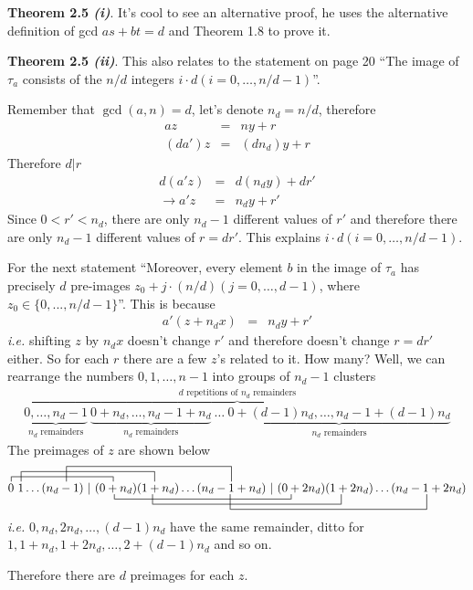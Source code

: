 \documentclass[aps,preprint,preprintnumbers,nofootinbib,showpacs,prd]{revtex4-1}
\newcommand{\ie}{{\it i.e.} }
\newcommand{\nbea}{\begin{eqnarray*}}
\newcommand{\neea}{\end{eqnarray*}}
\begin{document}
{\bf Theorem 2.5 {\it(i)}}. It's cool to see an alternative proof, he uses the alternative definition of gcd $as + bt = d$ and Theorem 1.8 to prove it. 

{\bf Theorem 2.5 {\it(ii)}}. This also relates to the statement on page 20 ``The image of $\tau_a$ consists of the $n/d$ integers $i\cdot d (i = 0, \dots, n/d - 1)$''.

Remember that $\gcd(a,n) = d$, let's denote $n_d = n/d$, therefore
%
\nbea
az & = & ny + r \\
(da')z & = & (dn_d)y + r
\neea
%
Therefore $d|r$
%
\nbea
d(a'z) & = & d(n_d y) + dr' \\
\to a'z & = & n_d y + r'
\neea
%
Since $0 < r' < n_d$, there are only $n_d - 1$ different values of $r'$ and therefore there are only $n_d - 1$ different values of $r = dr'$. This explains $i\cdot d (i = 0, \dots, n/d - 1)$.

For the next statement ``Moreover, every element $b$ in the image of $\tau_a$ has precisely $d$ pre-images $z_0 + j \cdot (n/d) (j = 0, \dots , d - 1)$, where $z_0 \in \{0, . . . , n/d - 1\}$''. This is because
%
\nbea
a'(z + n_dx) & = & n_d y + r'
\neea
%
\ie shifting $z$ by $n_dx$ doesn't change $r'$ and therefore doesn't change $r = dr'$ either. So for each $r$ there are a few $z$'s related to it. How many? Well, we can rearrange the numbers $0,1, \dots, n-1$ into groups of $n_d-1$ clusters
%
\nbea
\overbrace{\underbrace{0, \dots, n_d - 1}_\text{$n_d$ remainders} ~ \underbrace{0 + n_d, \dots, n_d - 1 + n_d}_\text{$n_d$ remainders} ~ \dots ~ \underbrace{0 + (d-1) n_d, \dots, n_d - 1 + (d-1) n_d}_\text{$n_d$ remainders}}^\text{$d$ repetitions of $n_d$ remainders}
\neea
%
The preimages of $z$ are shown below
$$
\contraction{}{0}{~~~~~~~~~~~~~~~~~~~~~~~~~}{}
\contraction[2ex]{0~}{1}{~~~~~~~~~~~~~~~~~~~~~~~~~~~~~~~~~}{}
\contraction[3ex]{0~1~~~~~~~~~~}{1}{~~~~~~~~~~~~~~~~~~~~~~~~~~~~~~~~~~~~~~~~~}{}
\bcontraction{0~1~2~~(0~~~~~~~~~~~~~~~}{1}{~~~~~~~~~~~~~~~~~~~~~~~~~~~~~~~~~~~~~~~~~~~~}{}
\bcontraction[2ex]{0~1~2~~(0+n_d)(1~~~~~~~~~~~~~~}{1}{~~~~~~~~~~~~~~~~~~~~~~~~~~~~~~~~~~~~~~~~~~~~~~~}{}
\bcontraction[3ex]{0~1~2~~(0+n_d)(1 + n_d)(2~~~~~~~~~~~~~~~~~~~~~~~}{1}{~~~~~~~~~~~~~~~~~~~~~~~~~~~~~~~~~~~~~~~~~~~~~~~~~}{}
0~1 \dots (n_d-1)~|~(0+n_d)(1 + n_d) \dots (n_d - 1 + n_d) ~|~ (0+2n_d)(1 + 2n_d) \dots (n_d - 1 + 2n_d)
$$
\ie $0, n_d, 2n_d, \dots, (d-1)n_d$ have the same remainder, ditto for $1,1 + n_d, 1 + 2n_d, \dots, 2 + (d-1)n_d$ and so on.

Therefore there are $d$ preimages for each $z$.
\end{document}
